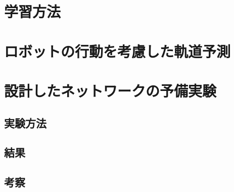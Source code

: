 \section{学習方法}

\section{ロボットの行動を考慮した軌道予測}

\section{設計したネットワークの予備実験}

\subsection{実験方法}
\subsection{結果}
\subsection{考察}

\newpage
